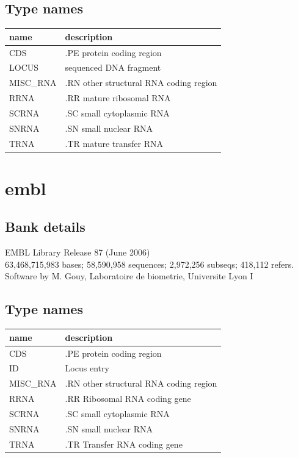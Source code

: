 \documentclass{article}
\begin{document}
\begin{Schunk}
\subsection{Type names}
\noindent\begin{tabular}{ll}
\hline \hline
name & description\\
\hline
CDS & .PE protein coding region \\
LOCUS & sequenced DNA fragment \\
MISC\_RNA & .RN other structural RNA coding region \\
RRNA & .RR mature ribosomal RNA \\
SCRNA & .SC small cytoplasmic RNA \\
SNRNA & .SN small nuclear RNA \\
TRNA & .TR mature transfer RNA \\
\hline \hline
\end{tabular}

\section{ embl }
\subsection{Bank details}
EMBL Library Release 87 (June 2006)\\
63,468,715,983 bases; 58,590,958 sequences; 2,972,256 subseqs; 418,112 refers.\\
Software by M. Gouy, Laboratoire de biometrie, Universite Lyon I

\subsection{Type names}
\noindent\begin{tabular}{ll}
\hline \hline
name & description\\
\hline
CDS & .PE protein coding region \\
ID & Locus entry \\
MISC\_RNA & .RN other structural RNA coding region \\
RRNA & .RR Ribosomal RNA coding gene \\
SCRNA & .SC small cytoplasmic RNA \\
SNRNA & .SN small nuclear RNA \\
TRNA & .TR Transfer RNA coding gene \\
\hline \hline
\end{tabular}


\end{Schunk}
\end{document}
